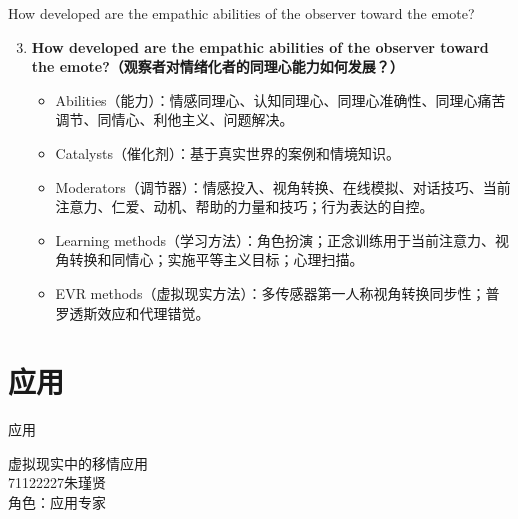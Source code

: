 \documentclass[aspectratio=169,xcolor=dvipsnames]{beamer}
\begin{document}
\begin{frame}{How developed are the empathic abilities of the observer toward the emote?}
    \begin{enumerate}
        \setcounter{enumi}{2}
        \item \textbf{How developed are the empathic abilities of the observer toward the emote?（观察者对情绪化者的同理心能力如何发展？）}
        \begin{itemize}
            \item Abilities（能力）：情感同理心、认知同理心、同理心准确性、同理心痛苦调节、同情心、利他主义、问题解决。
            \item Catalysts（催化剂）：基于真实世界的案例和情境知识。
            \item Moderators（调节器）：情感投入、视角转换、在线模拟、对话技巧、当前注意力、仁爱、动机、帮助的力量和技巧；行为表达的自控。
            \item Learning methods（学习方法）：角色扮演；正念训练用于当前注意力、视角转换和同情心；实施平等主义目标；心理扫描。
            \item EVR methods（虚拟现实方法）：多传感器第一人称视角转换同步性；普罗透斯效应和代理错觉。
        \end{itemize}
    \end{enumerate}
\end{frame}



    

\section{应用}
\begin{frame}{应用}
    \begin{center}
        \Large{虚拟现实中的移情应用}\\
        \vspace{0.5cm}
        \normalsize{71122227朱瑾贤}
        \\
        \vspace{0.5cm}
        \normalsize{角色：应用专家}
    \end{center}
\end{frame}
\end{document}
